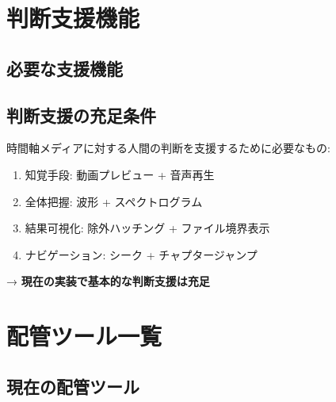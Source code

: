 \documentclass[10pt,a4paper,twocolumn]{ltjsarticle}
\begin{document}
\section{判断支援機能}

\subsection{必要な支援機能}

\vspace{0.5\baselineskip}
\vspace{0.5\baselineskip}

\subsection{判断支援の充足条件}

時間軸メディアに対する人間の判断を支援するために必要なもの:

\begin{enumerate}
\item 知覚手段: 動画プレビュー + 音声再生
\item 全体把握: 波形 + スペクトログラム
\item 結果可視化: 除外ハッチング + ファイル境界表示
\item ナビゲーション: シーク + チャプタージャンプ
\end{enumerate}

→ \textbf{現在の実装で基本的な判断支援は充足}

\section{配管ツール一覧}

\subsection{現在の配管ツール}
\end{document}
